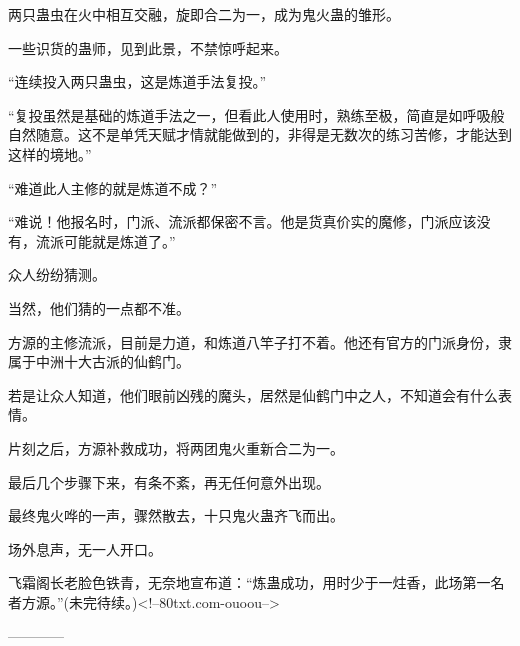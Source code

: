 \begin{this_body}
两只蛊虫在火中相互交融，旋即合二为一，成为鬼火蛊的雏形。

一些识货的蛊师，见到此景，不禁惊呼起来。

“连续投入两只蛊虫，这是炼道手法复投。”

“复投虽然是基础的炼道手法之一，但看此人使用时，熟练至极，简直是如呼吸般自然随意。这不是单凭天赋才情就能做到的，非得是无数次的练习苦修，才能达到这样的境地。”

“难道此人主修的就是炼道不成？”

“难说！他报名时，门派、流派都保密不言。他是货真价实的魔修，门派应该没有，流派可能就是炼道了。”

众人纷纷猜测。

当然，他们猜的一点都不准。

方源的主修流派，目前是力道，和炼道八竿子打不着。他还有官方的门派身份，隶属于中洲十大古派的仙鹤门。

若是让众人知道，他们眼前凶残的魔头，居然是仙鹤门中之人，不知道会有什么表情。

片刻之后，方源补救成功，将两团鬼火重新合二为一。

最后几个步骤下来，有条不紊，再无任何意外出现。

最终鬼火哗的一声，骤然散去，十只鬼火蛊齐飞而出。

场外息声，无一人开口。

飞霜阁长老脸色铁青，无奈地宣布道：“炼蛊成功，用时少于一炷香，此场第一名者方源。”(未完待续。)<!--80txt.com-ouoou-->

------------

\end{this_body}

